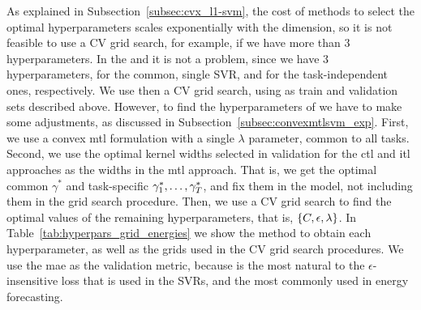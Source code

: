 %
As explained in Subsection~\ref{subsec:cvx_l1-svm}, the cost of methods to select the optimal hyperparameters scales exponentially with the dimension, so it is not feasible to use a CV grid search, for example, if we have more than $3$ hyperparameters.
%
In the  and  it is not a problem, since we have $3$ hyperparameters, for the common, single SVR, and for the task-independent ones, respectively. We use then a CV grid search, using as train and validation sets described above.
However, to find the hyperparameters of  we have to make some adjustments, as discussed in Subsection~\ref{subsec:convexmtlsvm_exp}. 
%
First, we use a convex \acrshort{mtl} formulation with a single $\lambda$ parameter, common to all tasks.
%
Second, we use the optimal kernel widths selected in validation for the \acrshort{ctl} and \acrshort{itl} approaches as the widths in the \acrshort{mtl} approach. That is, we get the optimal common $\gamma^*$ and task-specific $\gamma^*_1, \ldots, \gamma^*_T$, and fix them in the  model, not including them in the grid search procedure.
Then, we use a CV grid search to find the optimal values of the remaining hyperparameters, that is, $\left\{C, \epsilon, \lambda\right\}$.
%
In Table~\ref{tab:hyperpars_grid_energies} we show the method to obtain each hyperparameter, as well as the grids used in the CV grid search procedures.
We use the \acrshort{mae} as the validation metric, because is the most natural to the $\epsilon$-insensitive loss that is used in the SVRs, and the most commonly used in energy forecasting.

